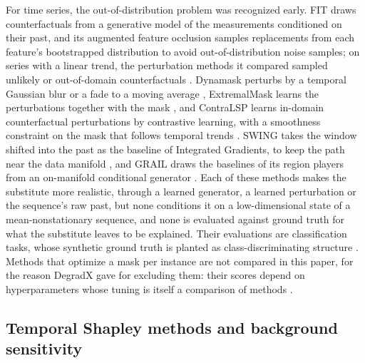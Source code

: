 \documentclass{article}
\begin{document}
For time series, the out-of-distribution problem was recognized early. FIT draws counterfactuals from a generative model of the measurements conditioned on their past, and its augmented feature occlusion samples replacements from each feature's bootstrapped distribution to avoid out-of-distribution noise samples; on series with a linear trend, the perturbation methods it compared sampled unlikely or out-of-domain counterfactuals \citep{tonekaboni2020went}. Dynamask perturbs by a temporal Gaussian blur or a fade to a moving average \citep{crabbe2021explaining}, ExtremalMask learns the perturbations together with the mask \citep{enguehard2023learning}, and ContraLSP learns in-domain counterfactual perturbations by contrastive learning, with a smoothness constraint on the mask that follows temporal trends \citep{liu2024explaining}. SWING takes the window shifted into the past as the baseline of Integrated Gradients, to keep the path near the data manifold \citep{kim2026deltaxai}, and GRAIL draws the baselines of its region players from an on-manifold conditional generator \citep{menadjiev2026grail}. Each of these methods makes the substitute more realistic, through a learned generator, a learned perturbation or the sequence's raw past, but none conditions it on a low-dimensional state of a mean-nonstationary sequence, and none is evaluated against ground truth for what the substitute leaves to be explained. Their evaluations are classification tasks, whose synthetic ground truth is planted as class-discriminating structure \citep{tonekaboni2020went, enguehard2023learning, liu2024explaining}. Methods that optimize a mask per instance are not compared in this paper, for the reason DegradX gave for excluding them: their scores depend on hyperparameters whose tuning is itself a comparison of methods \citep{degradx2026}.

\subsection{Temporal Shapley methods and background sensitivity}\label{sec:related:tshap}
\end{document}
